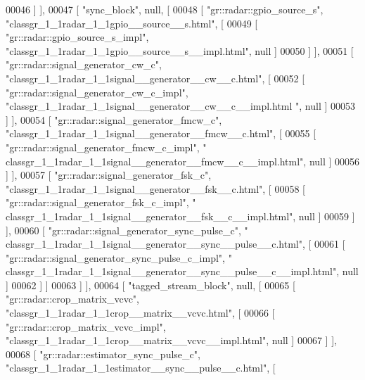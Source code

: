 \begin{DoxyCode}
00046     ] ],
00047     [ \textcolor{stringliteral}{"sync\_block"}, null, [
00048       [ \textcolor{stringliteral}{"gr::radar::gpio\_source\_s"}, \textcolor{stringliteral}{"classgr\_1\_1radar\_1\_1gpio\_\_source\_\_s.html"}, [
00049         [ \textcolor{stringliteral}{"gr::radar::gpio\_source\_s\_impl"}, \textcolor{stringliteral}{"classgr\_1\_1radar\_1\_1gpio\_\_source\_\_s\_\_impl.html"}, null ]
00050       ] ],
00051       [ \textcolor{stringliteral}{"gr::radar::signal\_generator\_cw\_c"}, \textcolor{stringliteral}{"classgr\_1\_1radar\_1\_1signal\_\_generator\_\_cw\_\_c.html"}, [
00052         [ \textcolor{stringliteral}{"gr::radar::signal\_generator\_cw\_c\_impl"}, \textcolor{stringliteral}{"classgr\_1\_1radar\_1\_1signal\_\_generator\_\_cw\_\_c\_\_impl.html
      "}, null ]
00053       ] ],
00054       [ \textcolor{stringliteral}{"gr::radar::signal\_generator\_fmcw\_c"}, \textcolor{stringliteral}{"classgr\_1\_1radar\_1\_1signal\_\_generator\_\_fmcw\_\_c.html"}, [
00055         [ \textcolor{stringliteral}{"gr::radar::signal\_generator\_fmcw\_c\_impl"}, \textcolor{stringliteral}{"
      classgr\_1\_1radar\_1\_1signal\_\_generator\_\_fmcw\_\_c\_\_impl.html"}, null ]
00056       ] ],
00057       [ \textcolor{stringliteral}{"gr::radar::signal\_generator\_fsk\_c"}, \textcolor{stringliteral}{"classgr\_1\_1radar\_1\_1signal\_\_generator\_\_fsk\_\_c.html"}, [
00058         [ \textcolor{stringliteral}{"gr::radar::signal\_generator\_fsk\_c\_impl"}, \textcolor{stringliteral}{"
      classgr\_1\_1radar\_1\_1signal\_\_generator\_\_fsk\_\_c\_\_impl.html"}, null ]
00059       ] ],
00060       [ \textcolor{stringliteral}{"gr::radar::signal\_generator\_sync\_pulse\_c"}, \textcolor{stringliteral}{"
      classgr\_1\_1radar\_1\_1signal\_\_generator\_\_sync\_\_pulse\_\_c.html"}, [
00061         [ \textcolor{stringliteral}{"gr::radar::signal\_generator\_sync\_pulse\_c\_impl"}, \textcolor{stringliteral}{"
      classgr\_1\_1radar\_1\_1signal\_\_generator\_\_sync\_\_pulse\_\_c\_\_impl.html"}, null ]
00062       ] ]
00063     ] ],
00064     [ \textcolor{stringliteral}{"tagged\_stream\_block"}, null, [
00065       [ \textcolor{stringliteral}{"gr::radar::crop\_matrix\_vcvc"}, \textcolor{stringliteral}{"classgr\_1\_1radar\_1\_1crop\_\_matrix\_\_vcvc.html"}, [
00066         [ \textcolor{stringliteral}{"gr::radar::crop\_matrix\_vcvc\_impl"}, \textcolor{stringliteral}{"classgr\_1\_1radar\_1\_1crop\_\_matrix\_\_vcvc\_\_impl.html"}, null ]
00067       ] ],
00068       [ \textcolor{stringliteral}{"gr::radar::estimator\_sync\_pulse\_c"}, \textcolor{stringliteral}{"classgr\_1\_1radar\_1\_1estimator\_\_sync\_\_pulse\_\_c.html"}, [

\end{DoxyCode}
